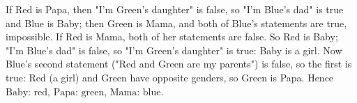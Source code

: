 If Red is Papa, then "I'm Green's daughter" is false, so "I'm Blue's dad" is true and Blue is Baby; then Green is Mama, and both of Blue's statements are true, impossible. If Red is Mama, both of her statements are false. So Red is Baby; "I'm Blue's dad" is false, so "I'm Green's daughter" is true: Baby is a girl. Now Blue's second statement ("Red and Green are my parents") is false, so the first is true: Red (a girl) and Green have opposite genders, so Green is Papa. Hence $\boxed{\text{Baby: red, Papa: green, Mama: blue}}$.
